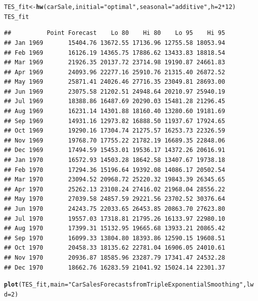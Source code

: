 \documentclass[10pt]{article}\usepackage[]{graphicx}\usepackage[]{color}
\makeatletter
\newcommand{\hlnum}[1]{\textcolor[rgb]{0.686,0.059,0.569}{#1}}%
\newcommand{\hlstr}[1]{\textcolor[rgb]{0.192,0.494,0.8}{#1}}%
\newcommand{\hlopt}[1]{\textcolor[rgb]{0,0,0}{#1}}%
\newcommand{\hlstd}[1]{\textcolor[rgb]{0.345,0.345,0.345}{#1}}%
\newcommand{\hlkwb}[1]{\textcolor[rgb]{0.69,0.353,0.396}{#1}}%
\newcommand{\hlkwc}[1]{\textcolor[rgb]{0.333,0.667,0.333}{#1}}%
\newcommand{\hlkwd}[1]{\textcolor[rgb]{0.737,0.353,0.396}{\textbf{#1}}}%
\newenvironment{kframe}{%
 \def\at@end@of@kframe{}%
 \ifinner\ifhmode%
  \def\at@end@of@kframe{\end{minipage}}%
  \begin{minipage}{\columnwidth}%
 \fi\fi%
 \def\FrameCommand##1{\hskip\@totalleftmargin \hskip-\fboxsep
 \colorbox{shadecolor}{##1}\hskip-\fboxsep
     \hskip-\linewidth \hskip-\@totalleftmargin \hskip\columnwidth}%
 \MakeFramed {\advance\hsize-\width
   \@totalleftmargin\z@ \linewidth\hsize
   \@setminipage}}%
 {\par\unskip\endMakeFramed%
 \at@end@of@kframe}
\newenvironment{knitrout}{}{} %
\makeatother
\begin{document}
\begin{knitrout}
\color{fgcolor}\begin{kframe}
\begin{alltt}
\hlstd{TES_fit} \hlkwb{<-} \hlkwd{hw}\hlstd{(carSale,} \hlkwc{initial} \hlstd{=} \hlstr{"optimal"}\hlstd{,} \hlkwc{seasonal} \hlstd{=} \hlstr{"additive"}\hlstd{,} \hlkwc{h} \hlstd{=} \hlnum{2}\hlopt{*}\hlnum{12}\hlstd{)}
\hlstd{TES_fit}
\end{alltt}
\begin{verbatim}
##          Point Forecast    Lo 80    Hi 80    Lo 95    Hi 95
## Jan 1969       15404.76 13672.55 17136.96 12755.58 18053.94
## Feb 1969       16126.19 14365.75 17886.62 13433.83 18818.54
## Mar 1969       21926.35 20137.72 23714.98 19190.87 24661.83
## Apr 1969       24093.96 22277.16 25910.76 21315.40 26872.52
## May 1969       25871.41 24026.46 27716.35 23049.81 28693.00
## Jun 1969       23075.58 21202.51 24948.64 20210.97 25940.19
## Jul 1969       18388.86 16487.69 20290.03 15481.28 21296.45
## Aug 1969       16231.14 14301.88 18160.40 13280.60 19181.69
## Sep 1969       14931.16 12973.82 16888.50 11937.67 17924.65
## Oct 1969       19290.16 17304.74 21275.57 16253.73 22326.59
## Nov 1969       19768.70 17755.22 21782.19 16689.35 22848.06
## Dec 1969       17494.59 15453.01 19536.17 14372.26 20616.91
## Jan 1970       16572.93 14503.28 18642.58 13407.67 19738.18
## Feb 1970       17294.36 15196.64 19392.08 14086.17 20502.54
## Mar 1970       23094.52 20968.72 25220.32 19843.39 26345.65
## Apr 1970       25262.13 23108.24 27416.02 21968.04 28556.22
## May 1970       27039.58 24857.59 29221.56 23702.52 30376.64
## Jun 1970       24243.75 22033.65 26453.85 20863.70 27623.80
## Jul 1970       19557.03 17318.81 21795.26 16133.97 22980.10
## Aug 1970       17399.31 15132.95 19665.68 13933.21 20865.42
## Sep 1970       16099.33 13804.80 18393.86 12590.15 19608.51
## Oct 1970       20458.33 18135.62 22781.04 16906.05 24010.61
## Nov 1970       20936.87 18585.96 23287.79 17341.47 24532.28
## Dec 1970       18662.76 16283.59 21041.92 15024.14 22301.37
\end{verbatim}
\begin{alltt}
\hlkwd{plot}\hlstd{(TES_fit,}\hlkwc{main} \hlstd{=} \hlstr{"Car Sales Forecasts from Triple Exponential Smoothing"}\hlstd{,} \hlkwc{lwd} \hlstd{=} \hlnum{2}\hlstd{)}
\end{alltt}
\end{kframe}

\end{knitrout}
\end{document}
